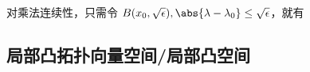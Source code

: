 对乘法连续性，只需令 $B(x_0,\sqrt{\epsilon}),\abs{\lambda-\lambda_0}\leq\sqrt{\epsilon}$，就有 $$


\subsection{局部凸拓扑向量空间/局部凸空间}





